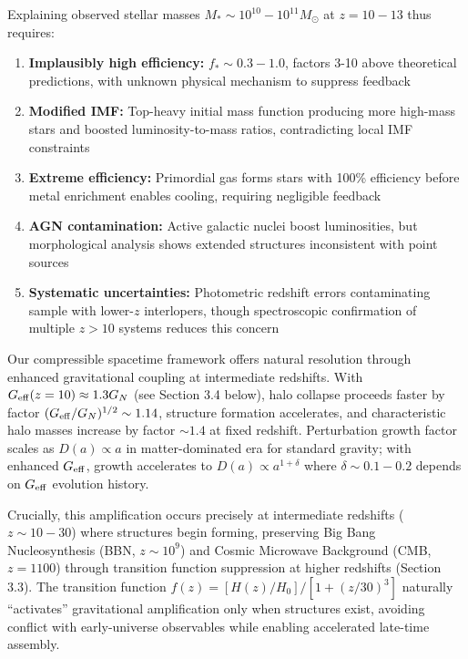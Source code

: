 \documentclass[11pt,a4paper]{article}
\providecommand{\tightlist}{\setlength{\itemsep}{0pt}\setlength{\parskip}{0pt}}
\begin{document}
Explaining observed stellar masses \(M_* \sim 10^{10}-10^{11} M_\odot\)
at \(z = 10-13\) thus requires:

\begin{enumerate}
\def\labelenumi{\arabic{enumi}.}
\tightlist
\item
  \textbf{Implausibly high efficiency:} \(f_* \sim 0.3-1.0\), factors
  3-10 above theoretical predictions, with unknown physical mechanism to
  suppress feedback
\item
  \textbf{Modified IMF:} Top-heavy initial mass function producing more
  high-mass stars and boosted luminosity-to-mass ratios, contradicting
  local IMF constraints
\item
  \textbf{Extreme efficiency:} Primordial gas forms stars with 100\%
  efficiency before metal enrichment enables cooling, requiring
  negligible feedback
\item
  \textbf{AGN contamination:} Active galactic nuclei boost luminosities,
  but morphological analysis shows extended structures inconsistent with
  point sources
\item
  \textbf{Systematic uncertainties:} Photometric redshift errors
  contaminating sample with lower-\(z\) interlopers, though
  spectroscopic confirmation of multiple \(z > 10\) systems reduces this
  concern
\end{enumerate}

Our compressible spacetime framework offers natural resolution through
enhanced gravitational coupling at intermediate redshifts. With
\(G_{\rm eff}(z=10) \approx 1.3 G_N\) (see Section 3.4 below), halo
collapse proceeds faster by factor
\((G_{\rm eff}/G_N)^{1/2} \sim 1.14\), structure formation accelerates,
and characteristic halo masses increase by factor \(\sim 1.4\) at fixed
redshift. Perturbation growth factor scales as \(D(a) \propto a\) in
matter-dominated era for standard gravity; with enhanced
\(G_{\rm eff}\), growth accelerates to \(D(a) \propto a^{1+\delta}\)
where \(\delta \sim 0.1-0.2\) depends on \(G_{\rm eff}\) evolution
history.

Crucially, this amplification occurs precisely at intermediate redshifts
(\(z \sim 10-30\)) where structures begin forming, preserving Big Bang
Nucleosynthesis (BBN, \(z \sim 10^9\)) and Cosmic Microwave Background
(CMB, \(z = 1100\)) through transition function suppression at higher
redshifts (Section 3.3). The transition function
\(f(z) = [H(z)/H_0]/[1+(z/30)^3]\) naturally ``activates'' gravitational
amplification only when structures exist, avoiding conflict with
early-universe observables while enabling accelerated late-time
assembly.
\end{document}
